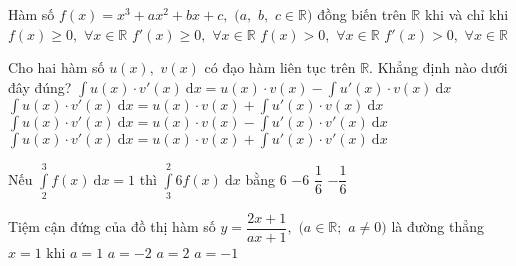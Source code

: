 \begin{ex}%
	Hàm số $f(x)=x^3+a x^2+b x+c,$ $(a,$ $ b,$ $ c \in \mathbb{R})$ đồng biến trên $\mathbb{R}$ khi và chỉ khi
	\choice
	{ $f(x) \geq 0,$ $ \forall x \in \mathbb{R}$}
	{\True $f'(x) \geq 0,$ $ \forall x \in \mathbb{R}$}
	{ $f(x)>0, $ $\forall x \in \mathbb{R}$}
	{ $f'(x)>0,$ $ \forall x \in \mathbb{R}$}
\end{ex}
\begin{ex}%
	Cho hai hàm số $u(x),$ $ v(x)$ có đạo hàm liên tục trên $\mathbb{R}$. Khẳng định nào dưới đây đúng?
	\choice
	{\True $\displaystyle\int u(x) \cdot v'(x) \mathrm{~d} x=u(x) \cdot v(x)-\displaystyle\int u'(x) \cdot v(x) \mathrm{~d} x$}
	{ $\displaystyle\int u(x) \cdot v'(x) \mathrm{~d} x=u(x) \cdot v(x)+\displaystyle\int u'(x) \cdot v(x) \mathrm{~d} x$}
	{ $\displaystyle\int u(x) \cdot v'(x) \mathrm{~d} x=u(x) \cdot v(x)-\displaystyle\int u'(x) \cdot v'(x) \mathrm{~d} x$}
	{ $\displaystyle\int u(x) \cdot v'(x) \mathrm{~d} x=u(x) \cdot v(x)+\displaystyle\int u'(x) \cdot v'(x) \mathrm{~d} x $}
\end{ex}
\begin{ex}%
	Nếu $\displaystyle\int\limits_2^3 f(x) \mathrm{~d} x=1$ thì $\displaystyle\int\limits_3^2 6 f(x) \mathrm{~d} x$ bằng
	\choice
	{ $6$}
	{\True $-6$}
	{ $\dfrac{1}{6}$}
	{ $-\dfrac{1}{6}$}
\end{ex}
\begin{ex}%
	Tiệm cận đứng của đồ thị hàm số $y=\dfrac{2 x+1}{a x+1},$ $(a \in \mathbb{R} ;$ $ a \neq 0)$ là đường thẳng $x=1$ khi
	\choice
	{$a=1$}
	{ $a=-2$}
	{ $a=2$}
	{\True $a=-1$}
\end{ex}
